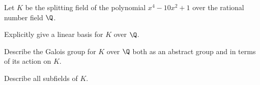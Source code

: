 Let $K$ be the splitting field of the polynomial $x^4-10x^2+1$ over
the rational number field $\Q$.
\begin{alist}
\item Explicitly give a linear basis for $K$ over $\Q$.
\item Describe the Galois group for $K$ over $\Q$ both as an abstract
group and in terms of its action on $K$.
\item Describe all subfields of $K$.
\end{alist}
